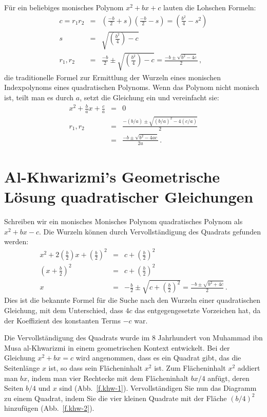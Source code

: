 Für ein beliebiges monisches Polynom $x^2+bx+c$ lauten die Lohschen Formeln:
\begin{eqnarray*}
c=r_1r_2&=&\left(\frac{-b}{2}+s\right)  \left(\frac{-b}{2}-s\right)=\left(\frac{b^2}{4}-s^2\right)\\
s&=&\sqrt{\left(\frac{b^2}{4}\right)-c}\\
r_1,r_2&=&\frac{-b}{2}\pm\sqrt{\left(\frac{b^2}{4}\right)-c}=\frac{-b\pm\sqrt{b^2-4c}}{2}\,,
\end{eqnarray*}
die traditionelle Formel zur Ermittlung der Wurzeln eines monischen Indexpolynoms eines quadratischen Polynoms. Wenn das Polynom nicht monisch ist, teilt man es durch $a$, setzt die Gleichung ein und vereinfacht sie:
\begin{eqnarray*}
x^2+\frac{b}{a}x+\frac{c}{a}&=&0\\
r_1,r_2&=&\frac{-(b/a)\pm\sqrt{(b/a)^2-4(c/a)}}{2}\\
&=&\frac{-b\pm\sqrt{b^2-4ac}}{2a}\,.
\end{eqnarray*}

\section{Al-Khwarizmi's Geometrische Lösung quadratischer Gleichungen}\label{s.khwar}

Schreiben wir ein monisches {Monisches Polynom} quadratisches Polynom als $x^2+bx-c$. Die Wurzeln können durch Vervollständigung des Quadrats gefunden werden:
\begin{eqnarray*}
x^2+2\left(\frac{b}{2}\right)x+\left(\frac{b}{2}\right)^2&=&c+\left(\frac{b}{2}\right)^2\\
\left(x+\frac{b}{2}\right)^2&=&c+\left(\frac{b}{2}\right)^2\\
x&=&-\frac{b}{2}\pm\sqrt{c+\left(\frac{b}{2}\right)^2}=
\frac{-b\pm\sqrt{b^2+4c}}{2}\,.
\end{eqnarray*}
Dies ist die bekannte Formel für die Suche nach den Wurzeln einer quadratischen Gleichung, mit dem Unterschied, dass $4c$ das entgegengesetzte Vorzeichen hat, da der Koeffizient des konstanten Terms $-c$ war.

Die Vervollständigung des Quadrats wurde im $8$ Jahrhundert von Muhammad ibn Musa al-Khwarizmi in einem geometrischen Kontext entwickelt. Bei der Gleichung $x^2+bx=c$ wird angenommen, dass es ein Quadrat gibt, das die Seitenlänge 
$x$ ist, so dass sein Flächeninhalt $x^2$ ist.
Zum Flächeninhalt $x^2$ addiert man $bx$, indem man vier Rechtecke mit dem Flächeninhalt $bx/4$ anfügt, deren Seiten $b/4$ und $x$ sind (Abb.~\ref{f.khw-1}). Vervollständigen Sie nun das Diagramm zu einem Quadrat, indem Sie die vier kleinen Quadrate mit der Fläche $(b/4)^2$ hinzufügen (Abb.~\ref{f.khw-2}).

